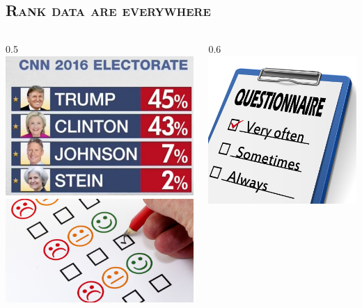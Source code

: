 \documentclass[xcolor=x11names,compress]{beamer}
\theoremstyle{plain}
\renewcommand{\(}{\begin{columns}}
\renewcommand{\)}{\end{columns}}
\newcommand{\<}[1]{\begin{column}{#1}}
\renewcommand{\>}{\end{column}}
\begin{document}
\subsection{\scshape Rank data are everywhere}
\begin{frame}{\insertsubsection}
	
	\([b]
	\<{0.5\linewidth}
		\includegraphics[width=0.9\columnwidth]{slides/USelection}\\
		\includegraphics[width=\columnwidth]{slides/employee-engagement}
	\>
	\hskip -1cm
	\<{0.6\linewidth}
		\includegraphics[width=0.9\columnwidth]{slides/questionnaire}
	\>
	\)
	

\end{frame}
\end{document}

